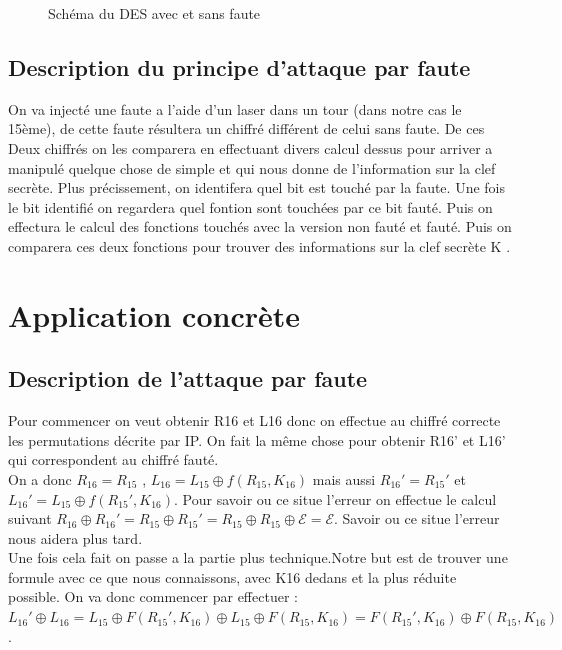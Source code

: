 \documentclass[a4paper]{report}
\begin{document}
\begin{figure}[h]
			
			\caption{Schéma du DES avec et sans faute}
			\end{figure}
		
			\section{Description du principe d'attaque par faute}
			
			 
			On va injecté une faute a l'aide d'un laser dans un tour (dans notre cas le 15ème), de cette faute résultera un chiffré différent de celui sans faute.
			De ces Deux chiffrés on les comparera en effectuant divers calcul dessus pour arriver a manipulé quelque chose de simple et qui nous donne de l'information sur la clef secrète.
			Plus précissement, on identifera quel bit est touché par la faute. Une fois le bit identifié on regardera quel fontion sont touchées par ce bit fauté.
			Puis on effectura le calcul des fonctions touchés avec la version non fauté et fauté. Puis on comparera ces deux fonctions pour trouver des informations sur la clef secrète K .
		\chapter{Application concrète}
			\section{Description de l'attaque par faute}
			Pour commencer on veut obtenir R16 et L16 donc on effectue au chiffré correcte les permutations décrite par IP. On fait la même chose pour obtenir R16' et L16' qui correspondent au chiffré fauté.\\
			On a donc $R_{16} = R_{15}$ , $L_{16} = L_{15}\oplus f(R_{15},K_{16})$ mais aussi $R_{16}'=R_{15}'$ et $L_{16}'=L_{15}\oplus f(R_{15}',K_{16})$.
			Pour savoir ou ce situe l'erreur on effectue le calcul suivant $R_{16}\oplus R_{16}' = R_{15}\oplus R_{15}' = R_{15}\oplus R_{15}\oplus \mathcal{E} = \mathcal{E}$. Savoir ou ce situe l'erreur nous aidera plus tard.\\
			
			Une fois cela fait on passe a la partie plus technique.Notre but est de trouver une formule avec ce que nous connaissons, avec K16 dedans et la plus réduite possible.
			On va donc commencer par effectuer :\\
			$L_{16}'\oplus L_{16} = L_{15}\oplus F(R_{15}',K_{16}) \oplus L_{15}\oplus F(R_{15},K_{16}) =F(R_{15}',K_{16})\oplus F(R_{15},K_{16})$.\\
			
\end{document}
